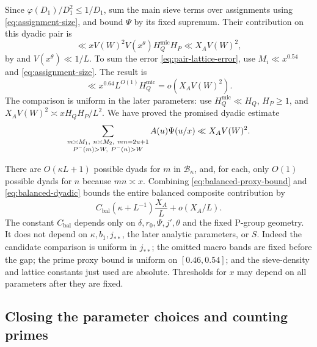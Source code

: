 Since $\varphi(D_1)/D_1^2\le1/D_1$, sum the main sieve terms over
assignments using \eqref{eq:assignment-size}, and bound $\Psi$
by its fixed supremum. Their contribution on this dyadic pair is
\[
 \ll xV(W)^2V(x^\theta)H_Q^{\mathrm{mic}}H_P
 \ll X_AV(W)^2,
\]
by  and
$V(x^\theta)\ll1/L$. To sum the error
\eqref{eq:pair-lattice-error}, use
$M_i\ll x^{0.54}$ and \eqref{eq:assignment-size}. The result is
\[
 \ll x^{0.64}L^{O(1)}H_Q^{\mathrm{mic}}
       =o(X_AV(W)^2).
\]
The comparison is uniform in the later parameters: use
$H_Q^{\mathrm{mic}}\ll H_Q$, $H_P\ge1$, and
$X_AV(W)^2\asymp xH_QH_P/L^2$.
We have proved the promised dyadic estimate
\begin{equation}\label{eq:balanced-dyadic}
 \sum_{\substack{m\asymp M_1,\ n\asymp M_2,\ mn=2u+1\\
                   P^{-}(m)>W,\ P^{-}(n)>W}}
             A(u)\Psi(u/x)\ll X_AV(W)^2.
\end{equation}

There are $O(\kappa L+1)$ possible dyads for $m$ in
$\mathcal B_\kappa$, and, for each, only $O(1)$ possible dyads
for $n$ because $mn\asymp x$. Combining
\eqref{eq:balanced-proxy-bound} and \eqref{eq:balanced-dyadic}
bounds the entire balanced composite contribution by
\begin{equation}\label{eq:balanced-final}
 C_{\mathrm{bal}}(\kappa+L^{-1})\frac{X_A}{L}+o(X_A/L).
\end{equation}
The constant $C_{\mathrm{bal}}$ depends only on
$\delta,r_0,\Psi,j',\theta$ and the fixed P-group geometry. It
does not depend on $\kappa,b_1,j_{**}$, the later analytic
parameters, or $S$. Indeed the candidate comparison is uniform
in $j_{**}$; the omitted macro bands are fixed before the gap;
the prime proxy bound is uniform on $[0.46,0.54]$; and the
sieve-density and lattice constants just used are absolute.
Thresholds for $x$ may depend on all parameters after they are
fixed.

\subsection{Closing the parameter choices and counting primes}

